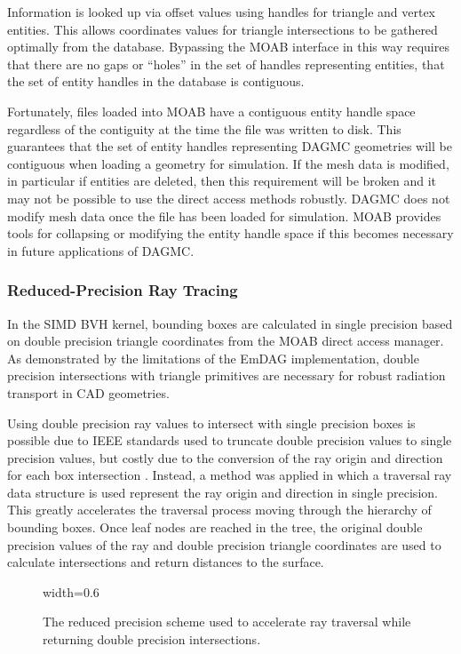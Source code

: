 Information is looked up via offset values using handles for triangle and vertex
entities. This allows coordinates values for triangle intersections to be
gathered optimally from the database. Bypassing the MOAB interface in this way
requires that there are no gaps or ``holes'' in the set of handles representing
entities, that the set of entity handles in the database is contiguous.

Fortunately, files loaded into MOAB have a contiguous entity handle space
regardless of the contiguity at the time the file was written to disk. This
guarantees that the set of entity handles representing DAGMC geometries will be
contiguous when loading a geometry for simulation. If the mesh data is modified,
in particular if entities are deleted, then this requirement will be broken and
it may not be possible to use the direct access methods robustly. DAGMC does not
modify mesh data once the file has been loaded for simulation. MOAB provides
tools for collapsing or modifying the entity handle space if this becomes
necessary in future applications of DAGMC.

\subsubsection{Reduced-Precision Ray Tracing}\label{subsubsec:reduced_precision}

In the SIMD BVH kernel, bounding boxes are calculated in single precision based
on double precision triangle coordinates from the MOAB direct access manager. As
demonstrated by the limitations of the EmDAG implementation, double precision
intersections with triangle primitives are necessary for robust radiation
transport in CAD geometries.

Using double precision ray values to intersect with single precision boxes is
possible due to IEEE standards used to truncate double precision values to single
precision values, but costly due to the conversion of the ray origin and
direction for each box intersection \cite{IEEE_STD_2008}. Instead, a method was
applied in which a traversal ray data structure is used represent the ray origin
and direction in single precision. This greatly accelerates the traversal
process moving through the hierarchy of bounding boxes. Once leaf nodes are
reached in the tree, the original double precision values of the ray and double
precision triangle coordinates are used to calculate intersections and return
distances to the surface.

\begin{figure}[H]
  \centering
  {width=0.6\textwidth}
  \caption{The reduced precision scheme used to accelerate ray traversal while
    returning double precision intersections.}
  \label{fig:reduced_precision_scheme}
\end{figure}

